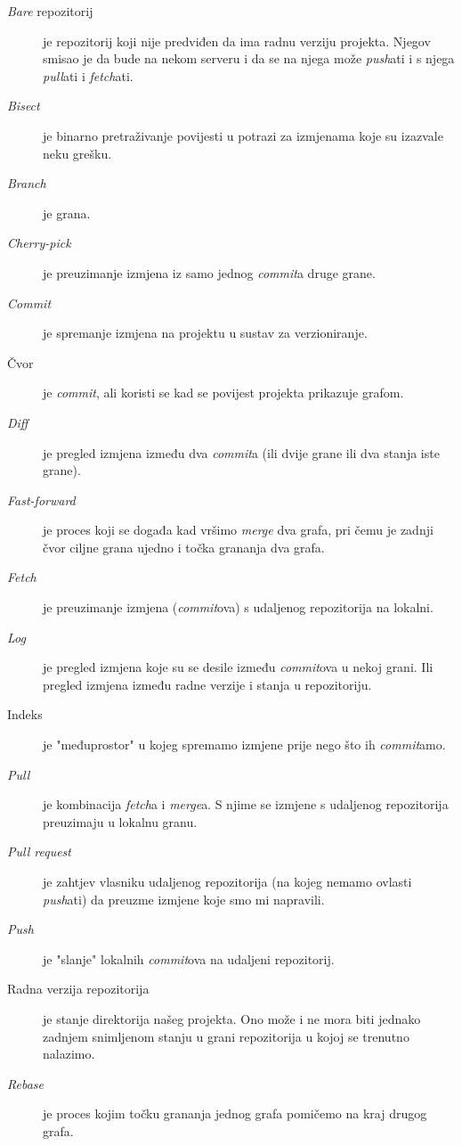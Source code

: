 \begin{description}
    \item[\emph{Bare} repozitorij] je repozitorij koji nije predviđen da ima radnu verziju projekta. Njegov smisao je da bude na nekom serveru i da se na njega može \emph{push}ati i s njega \emph{pull}ati i \emph{fetch}ati.
    \item[\emph{Bisect}] je binarno pretraživanje povijesti u potrazi za izmjenama koje su izazvale neku grešku.
    \item[\emph{Branch}] je grana.
    \item[\emph{Cherry-pick}] je preuzimanje izmjena iz samo jednog \emph{commit}a druge grane.
    \item[\emph{Commit}] je spremanje izmjena na projektu u sustav za verzioniranje.
    \item[Čvor] je \emph{commit}, ali koristi se kad se povijest projekta prikazuje grafom.
    \item[\emph{Diff}] je pregled izmjena između dva \emph{commit}a (ili dvije grane ili dva stanja iste grane).
    \item[\emph{Fast-forward}] je proces koji se događa kad vršimo \emph{merge} dva grafa, pri čemu je zadnji čvor ciljne grana ujedno i točka grananja dva grafa.
    \item[\emph{Fetch}] je preuzimanje izmjena (\emph{commit}ova) s udaljenog repozitorija na lokalni.
    \item[\emph{Log}] je pregled izmjena koje su se desile između \emph{commit}ova u nekoj grani. Ili pregled izmjena između radne verzije i stanja u repozitoriju.
    \item[Indeks] je "međuprostor" u kojeg spremamo izmjene prije nego što ih \emph{commit}amo.
    \item[\emph{Pull}] je kombinacija \emph{fetch}a i \emph{merge}a. S njime se izmjene s udaljenog repozitorija preuzimaju u lokalnu granu.
    \item[\emph{Pull request}] je zahtjev vlasniku udaljenog repozitorija (na kojeg nemamo ovlasti \emph{push}ati) da preuzme izmjene koje smo mi napravili.
    \item[\emph{Push}] je "slanje" lokalnih \emph{commit}ova na udaljeni repozitorij.
    \item[Radna verzija repozitorija] je stanje direktorija našeg projekta. Ono može i ne mora biti jednako zadnjem snimljenom stanju u grani repozitorija u kojoj se trenutno nalazimo.
    \item[\emph{Rebase}] je proces kojim točku grananja jednog grafa pomičemo na kraj drugog grafa.

\end{description}
